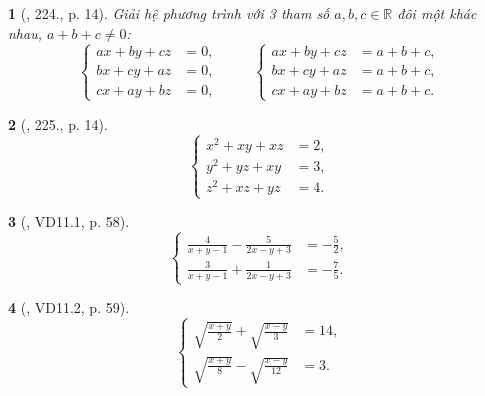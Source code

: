\documentclass{article}
\newtheorem{baitoan}{}
\begin{document}
\begin{baitoan}[\cite{Binh_Toan_9_tap_2}, 224., p. 14]
	Giải hệ phương trình với 3 tham số $a,b,c\in\mathbb{R}$ đôi một khác nhau, $a + b + c\ne0$:
	\begin{equation*}
		\left\{\begin{split}
			ax + by + cz &= 0,\\
			bx + cy + az &= 0,\\
			cx + ay + bz &= 0,
		\end{split}\right.\hspace{1cm}\left\{\begin{split}
			ax + by + cz &= a + b + c,\\
			bx + cy + az &= a + b + c,\\
			cx + ay + bz &= a + b + c.
		\end{split}\right.
	\end{equation*}
\end{baitoan}

\begin{baitoan}[\cite{Binh_Toan_9_tap_2}, 225., p. 14]
	\begin{equation*}
		\left\{\begin{split}
			x^2 + xy + xz &= 2,\\
			y^2 + yz + xy &= 3,\\
			z^2 + xz + yz &= 4.
		\end{split}\right.
	\end{equation*}
\end{baitoan}

\begin{baitoan}[\cite{TLCT_THCS_Toan_9_dai_so}, VD11.1, p. 58]
	\begin{equation*}
		\left\{\begin{split}
			\frac{4}{x + y - 1} - \frac{5}{2x - y + 3} &= -\frac{5}{2},\\
			\frac{3}{x + y - 1} + \frac{1}{2x - y + 3} &= -\frac{7}{5}.
		\end{split}\right.
	\end{equation*}
\end{baitoan}

\begin{baitoan}[\cite{TLCT_THCS_Toan_9_dai_so}, VD11.2, p. 59]
	\begin{equation*}
		\left\{\begin{split}
			\sqrt{\frac{x + y}{2}} + \sqrt{\frac{x - y}{3}} &= 14,\\
			\sqrt{\frac{x + y}{8}} - \sqrt{\frac{x - y}{12}} &= 3.
		\end{split}\right.
	\end{equation*}
\end{baitoan}
\end{document}
